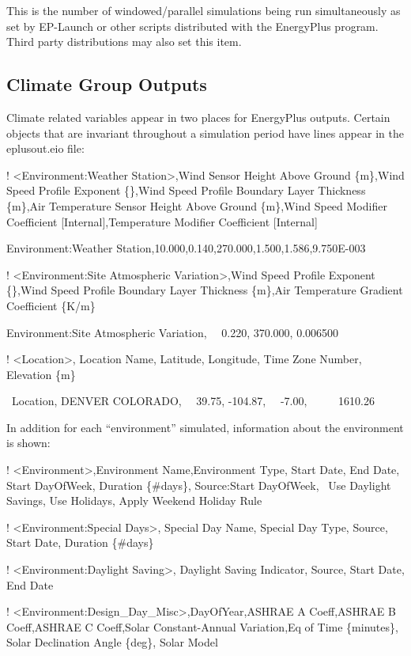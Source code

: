 This is the number of windowed/parallel simulations being run simultaneously as set by EP-Launch or other scripts distributed with the EnergyPlus program. Third party distributions may also set this item.

\subsection{Climate Group Outputs}\label{climate-group-outputs}

Climate related variables appear in two places for EnergyPlus outputs. Certain objects that are invariant throughout a simulation period have lines appear in the eplusout.eio file:

! \textless{}Environment:Weather Station\textgreater{},Wind Sensor Height Above Ground \{m\},Wind Speed Profile Exponent \{\},Wind Speed Profile Boundary Layer Thickness \{m\},Air Temperature Sensor Height Above Ground \{m\},Wind Speed Modifier Coefficient {[}Internal{]},Temperature Modifier Coefficient {[}Internal{]}

Environment:Weather Station,10.000,0.140,270.000,1.500,1.586,9.750E-003

! \textless{}Environment:Site Atmospheric Variation\textgreater{},Wind Speed Profile Exponent \{\},Wind Speed Profile Boundary Layer Thickness \{m\},Air Temperature Gradient Coefficient \{K/m\}

Environment:Site Atmospheric Variation,~~ 0.220, 370.000, 0.006500

! \textless{}Location\textgreater{}, Location Name, Latitude, Longitude, Time Zone Number, Elevation \{m\}

~Location, DENVER COLORADO,~~ 39.75, -104.87,~~ -7.00,~~~~~ 1610.26

In addition for each ``environment'' simulated, information about the environment is shown:

! \textless{}Environment\textgreater{},Environment Name,Environment Type, Start Date, End Date, Start DayOfWeek, Duration \{\#days\}, Source:Start DayOfWeek,~ Use Daylight Savings, Use Holidays, Apply Weekend Holiday Rule

! \textless{}Environment:Special Days\textgreater{}, Special Day Name, Special Day Type, Source, Start Date, Duration \{\#days\}

! \textless{}Environment:Daylight Saving\textgreater{}, Daylight Saving Indicator, Source, Start Date, End Date

! \textless{}Environment:Design\_Day\_Misc\textgreater{},DayOfYear,ASHRAE A Coeff,ASHRAE B Coeff,ASHRAE C Coeff,Solar Constant-Annual Variation,Eq of Time \{minutes\}, Solar Declination Angle \{deg\}, Solar Model

